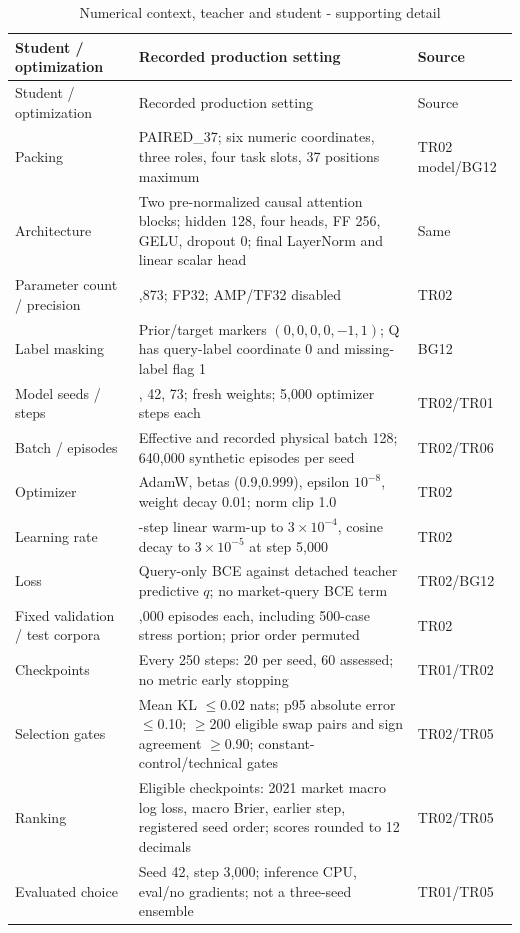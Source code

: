 \begin{longtable}[]{@{}
  >{\raggedright\arraybackslash}p{}
  >{\raggedright\arraybackslash}p{}
  >{\raggedright\arraybackslash}p{}@{}}
\caption{Numerical context, teacher and student - supporting detail}\label{tab:C_configuration:8}\tabularnewline
\toprule\noalign{}
Student / optimization
 & Recorded production setting
 & Source
 \\
\midrule\noalign{}
\endfirsthead
\toprule\noalign{}
Student / optimization
 & Recorded production setting
 & Source
 \\
\midrule\noalign{}
\endhead
\bottomrule\noalign{}
\endlastfoot
Packing & PAIRED\_\allowbreak{}37; six numeric coordinates, three roles, four task slots, 37 positions maximum & TR02 model/BG12 \\
Architecture & Two pre-normalized causal attention blocks; hidden 128, four heads, FF 256, GELU, dropout 0; final LayerNorm and linear scalar head & Same \\
Parameter count / precision & 271,873; FP32; AMP/TF32 disabled & TR02 \\
Label masking & Prior/target markers \((0,0,0,0,-1,1)\); Q has query-label coordinate 0 and missing-label flag 1 & BG12 \\
Model seeds / steps & 17, 42, 73; fresh weights; 5,000 optimizer steps each & TR02/TR01 \\
Batch / episodes & Effective and recorded physical batch 128; 640,000 synthetic episodes per seed & TR02/TR06 \\
Optimizer & AdamW, betas (0.9,0.999), epsilon \(10^{-8}\), weight decay 0.01; norm clip 1.0 & TR02 \\
Learning rate & 250-step linear warm-up to \(3\times10^{-4}\), cosine decay to \(3\times10^{-5}\) at step 5,000 & TR02 \\
Loss & Query-only BCE against detached teacher predictive \(q\); no market-query BCE term & TR02/BG12 \\
Fixed validation / test corpora & 5,000 episodes each, including 500-case stress portion; prior order permuted & TR02 \\
Checkpoints & Every 250 steps: 20 per seed, 60 assessed; no metric early stopping & TR01/TR02 \\
Selection gates & Mean KL \ensuremath{\leq}0.02 nats; p95 absolute error \ensuremath{\leq}0.10; \ensuremath{\geq}200 eligible swap pairs and sign agreement \ensuremath{\geq}0.90; constant-control/technical gates & TR02/TR05 \\
Ranking & Eligible checkpoints: 2021 market macro log loss, macro Brier, earlier step, registered seed order; scores rounded to 12 decimals & TR02/TR05 \\
Evaluated choice & Seed 42, step 3,000; inference CPU, eval/no gradients; not a three-seed ensemble & TR01/TR05 \\
\end{longtable}

